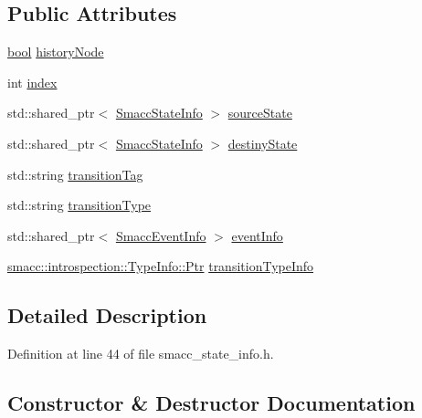 \subsection*{Public Attributes}
\begin{DoxyCompactItemize}
\item 
\hyperlink{classbool}{bool} \hyperlink{structsmacc_1_1introspection_1_1SmaccTransitionInfo_acbb8f7891dd0c541b26feb82149cb780}{history\+Node}
\item 
int \hyperlink{structsmacc_1_1introspection_1_1SmaccTransitionInfo_a4b9e9f140aefd8ecd6697bcaa4b681af}{index}
\item 
std\+::shared\+\_\+ptr$<$ \hyperlink{classsmacc_1_1introspection_1_1SmaccStateInfo}{Smacc\+State\+Info} $>$ \hyperlink{structsmacc_1_1introspection_1_1SmaccTransitionInfo_aa44f16d098eb91ed222008fe0abf1275}{source\+State}
\item 
std\+::shared\+\_\+ptr$<$ \hyperlink{classsmacc_1_1introspection_1_1SmaccStateInfo}{Smacc\+State\+Info} $>$ \hyperlink{structsmacc_1_1introspection_1_1SmaccTransitionInfo_a041f159a4cd56cfbc005765d093d0d4a}{destiny\+State}
\item 
std\+::string \hyperlink{structsmacc_1_1introspection_1_1SmaccTransitionInfo_aece8c6af9a682232a435ca1d92b953bd}{transition\+Tag}
\item 
std\+::string \hyperlink{structsmacc_1_1introspection_1_1SmaccTransitionInfo_a8f4682c18a3b6c09f6b942a4fa7b524d}{transition\+Type}
\item 
std\+::shared\+\_\+ptr$<$ \hyperlink{structsmacc_1_1introspection_1_1SmaccEventInfo}{Smacc\+Event\+Info} $>$ \hyperlink{structsmacc_1_1introspection_1_1SmaccTransitionInfo_a573be95bb6fdeeae46fc5ed56b260138}{event\+Info}
\item 
\hyperlink{classsmacc_1_1introspection_1_1TypeInfo_aa6ffd9c39811d59f7c771941b7fad860}{smacc\+::introspection\+::\+Type\+Info\+::\+Ptr} \hyperlink{structsmacc_1_1introspection_1_1SmaccTransitionInfo_a98364c74dec9e1cf1337743ce0771a33}{transition\+Type\+Info}
\end{DoxyCompactItemize}


\subsection{Detailed Description}


Definition at line 44 of file smacc\+\_\+state\+\_\+info.\+h.



\subsection{Constructor \& Destructor Documentation}
\mbox{\label{structsmacc_1_1introspection_1_1SmaccTransitionInfo_ad9f52aaeeecec400ac9419cc69054204}} 
